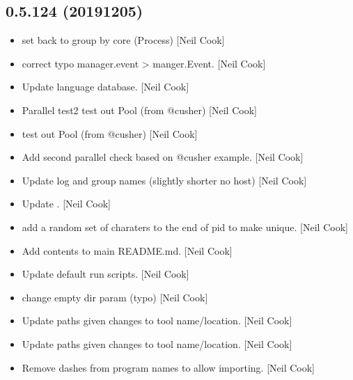 \documentclass[a4paper,10pt,english]{report}
\begin{document}
\subsection{0.5.124 (2019\sphinxhyphen{}12\sphinxhyphen{}05)}
\label{\detokenize{misc/changelog:id37}}\begin{itemize}
\item {} 
 \sphinxhyphen{} set  back to group
by core (Process) {[}Neil Cook{]}

\item {} 
 \sphinxhyphen{} correct typo manager.event \textendash{}\textgreater{}
manger.Event. {[}Neil Cook{]}

\item {} 
Update language database. {[}Neil Cook{]}

\item {} 
Parallel test2 \sphinxhyphen{} test out Pool (from @cusher) {[}Neil Cook{]}

\item {} 
 \sphinxhyphen{} test out Pool (from @cusher)
{[}Neil Cook{]}

\item {} 
Add second parallel check based on @cusher example. {[}Neil Cook{]}

\item {} 
Update log and group names (slightly shorter \sphinxhyphen{} no host) {[}Neil Cook{]}

\item {} 
Update . {[}Neil Cook{]}

\item {} 
 \sphinxhyphen{} add a random set of charaters to the end of
pid to make unique. {[}Neil Cook{]}

\item {} 
Add contents to main README.md. {[}Neil Cook{]}

\item {} 
Update default run scripts. {[}Neil Cook{]}

\item {} 
 \sphinxhyphen{} change empty dir param (typo) {[}Neil
Cook{]}

\item {} 
Update paths given changes to tool name/location. {[}Neil Cook{]}

\item {} 
Update paths given changes to tool name/location. {[}Neil Cook{]}

\item {} 
Remove dashes from program names to allow importing. {[}Neil Cook{]}

\end{itemize}
\end{document}
